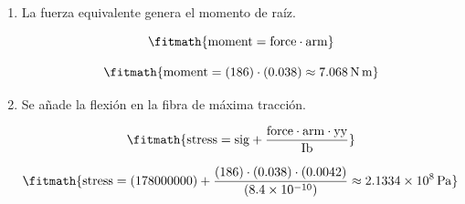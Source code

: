 \begin{enumerate}

\item La fuerza equivalente genera el momento de raíz.

\[\fitmath{\mathrm{moment}=\mathrm{force}\cdot \mathrm{arm}}\]

\[\fitmath{\mathrm{moment}=(186)\cdot (0.038)\approx 7.068\,\mathrm{N\,m}}\]

\item Se añade la flexión en la fibra de máxima tracción.

\[\fitmath{\mathrm{stress}=\mathrm{sig}+\frac{\mathrm{force}\cdot \mathrm{arm}\cdot \mathrm{yy}}{\mathrm{Ib}}}\]

\[\fitmath{\mathrm{stress}=(178000000)+\frac{(186)\cdot (0.038)\cdot (0.0042)}{(8.4\times10^{-10})}\approx 2.1334\times10^{8}\,\mathrm{Pa}}\]

\end{enumerate}
